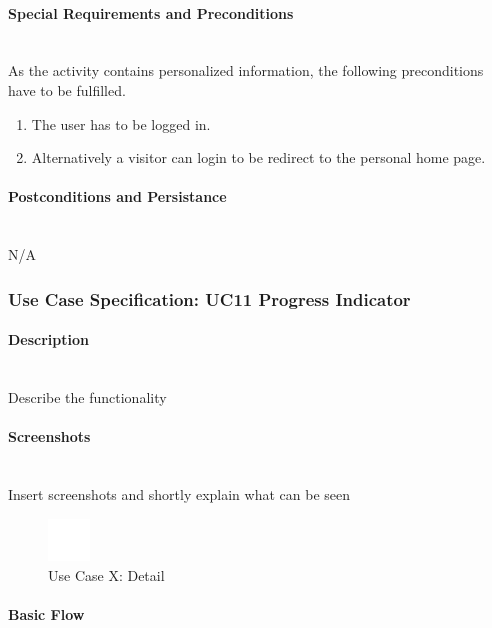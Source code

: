 \paragraph*{Special Requirements and Preconditions}\mbox{}\\
As the activity contains personalized information, the following preconditions have to be fulfilled.
\begin{enumerate}
	\vspace{-3mm}
	\setlength\itemsep{-1em}
	\item The user has to be logged in.
	\item Alternatively a visitor can login to be redirect to the personal home page.
\end{enumerate}

\paragraph*{Postconditions and Persistance}\mbox{}\\
N/A

\newpage
\subsubsection{Use Case Specification: \ac{UC}11 Progress Indicator}
\label{sec:domainBbl}

\paragraph*{Description}\mbox{}\\
Describe the functionality

\paragraph*{Screenshots}\mbox{}\\
Insert screenshots and shortly explain what can be seen
\begin{figure}[h] 
	\centering
	\includegraphics[width=0.1\textwidth]{Content/Domain/placeholder.png}
	\caption{Use Case X: Detail}
	\label{fig:label8}
\end{figure}

\paragraph*{Basic Flow} \mbox{}\\


